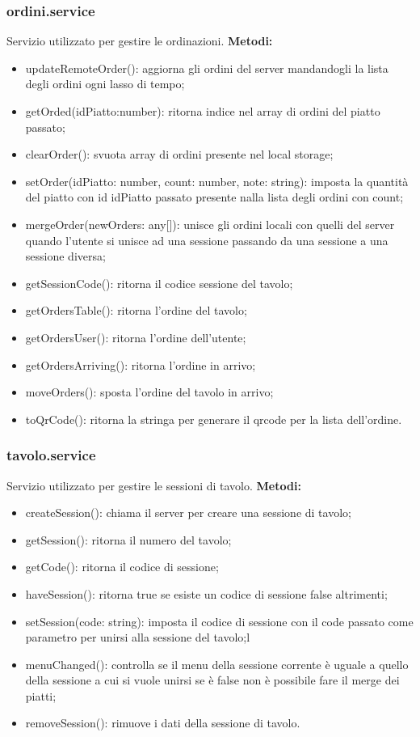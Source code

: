 \subsubsection{ordini.service}
Servizio utilizzato per gestire le ordinazioni.
\textbf{Metodi:}
\begin{itemize}
    \item updateRemoteOrder(): aggiorna gli ordini del server mandandogli la lista degli ordini ogni lasso di tempo;
    \item getOrded(idPiatto:number): ritorna indice nel array di ordini del piatto passato;
    \item clearOrder(): svuota array di ordini presente nel local storage;
    \item setOrder(idPiatto: number, count: number, note: string): imposta la quantità del piatto  con id idPiatto passato presente nalla lista degli ordini con count;
    \item mergeOrder(newOrders: any[]): unisce gli ordini locali con quelli del server quando l'utente si unisce ad una sessione passando da una sessione a una sessione diversa;
    \item getSessionCode(): ritorna il codice sessione del tavolo;
    \item getOrdersTable(): ritorna l'ordine del tavolo;
    \item getOrdersUser(): ritorna l'ordine dell'utente;
    \item getOrdersArriving(): ritorna l'ordine in arrivo;
    \item moveOrders(): sposta l'ordine del tavolo in arrivo;
    \item toQrCode(): ritorna la stringa per generare il qrcode per la lista dell'ordine.
\end{itemize}

\subsubsection{tavolo.service}
Servizio utilizzato per gestire le sessioni di tavolo.
\textbf{Metodi:}
\begin{itemize}
    \item createSession(): chiama il server per creare una sessione di tavolo;
    \item getSession(): ritorna il numero del tavolo;
    \item getCode(): ritorna il codice di sessione;
    \item haveSession(): ritorna true se esiste un codice di sessione false altrimenti;
    \item setSession(code: string): imposta il codice di sessione con il code passato come parametro per unirsi alla sessione del tavolo;l
    \item menuChanged(): controlla se il menu della sessione corrente è uguale a quello della sessione a cui si vuole unirsi se è false non è possibile fare il merge dei piatti;
    \item removeSession(): rimuove i dati della sessione di tavolo.
\end{itemize}


